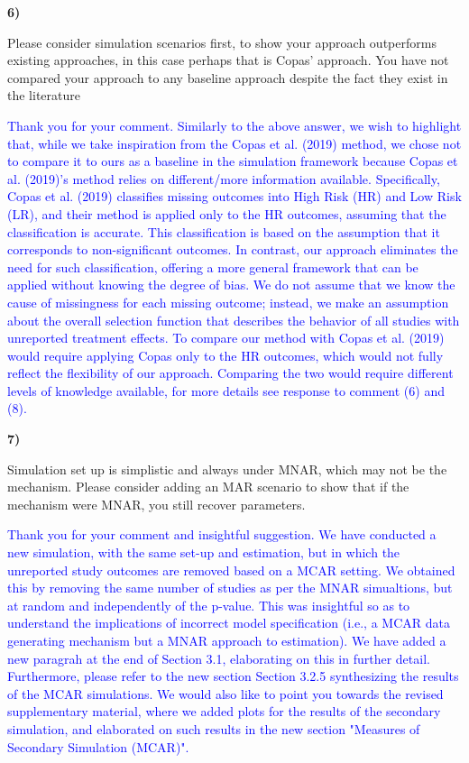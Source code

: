 \documentclass{article}
\begin{document}
\bigskip

\textbf{6)}

\bigskip

Please consider simulation scenarios first, to show your approach outperforms existing approaches, in this case perhaps that is Copas’ approach. You have not compared your approach to any baseline approach despite the fact they exist in the literature 

\bigskip

\textcolor{blue}{Thank you for your comment. Similarly to the above answer, we wish to highlight that, while we take inspiration from the Copas et al. (2019) method, we chose not to compare it to ours as a baseline in the simulation framework because Copas et al. (2019)'s method relies on different/more information available. Specifically, Copas et al. (2019) classifies missing outcomes into High Risk (HR) and Low Risk (LR), and their method is applied only to the HR outcomes, assuming that the classification is accurate. This classification is based on the assumption that it corresponds to non-significant outcomes. In contrast, our approach eliminates the need for such classification, offering a more general framework that can be applied without knowing the degree of bias. We do not assume that we know the cause of missingness for each missing outcome; instead, we make an assumption about the overall selection function that describes the behavior of all studies with unreported treatment effects. To compare our method with Copas et al. (2019) would require applying Copas only to the HR outcomes, which would not fully reflect the flexibility of our approach. Comparing the two would require different levels of knowledge available, for more details see response to comment (6) and (8).}

\bigskip

\textbf{7)}


\bigskip

Simulation set up is simplistic and always under MNAR, which may not be the mechanism. Please consider adding an MAR scenario to show that if the mechanism were MNAR, you still recover parameters. 

\bigskip

\textcolor{blue}{Thank you for your comment and insightful suggestion. We have conducted a new simulation, with the same set-up and estimation, but in which the unreported study outcomes are removed based on a MCAR setting. We obtained this by removing the same number of studies as per the MNAR simualtions, but at random and independently of the p-value. This was insightful so as to understand the implications of incorrect model specification (i.e., a MCAR data generating mechanism but a MNAR approach to estimation). We have added a new paragrah at the end of Section 3.1, elaborating on this in further detail. Furthermore, please refer to the new section Section 3.2.5 synthesizing the results of the MCAR simulations. We would also like to point you towards the revised supplementary material, where we added plots for the results of the secondary simulation, and elaborated on such results in the new section "Measures of Secondary Simulation (MCAR)".}
\end{document}
